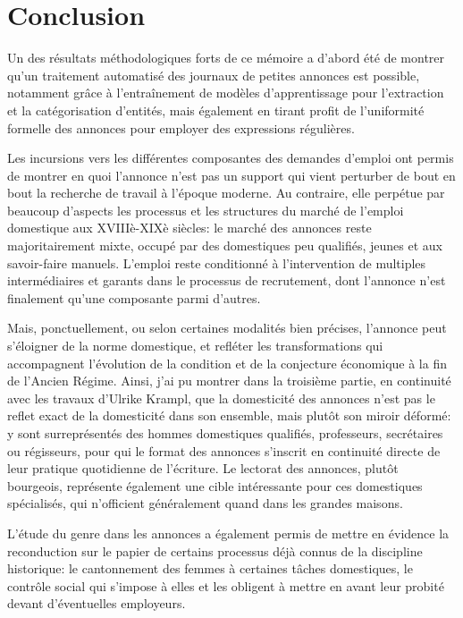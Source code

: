 \part*{Conclusion}


Un des résultats méthodologiques forts de ce mémoire a d'abord été de montrer qu'un traitement automatisé des journaux de petites annonces est possible, notamment grâce à l'entraînement de modèles d'apprentissage pour l'extraction et la catégorisation d'entités, mais également en tirant profit de l'uniformité formelle des annonces pour employer des expressions régulières. 

Les incursions vers les différentes composantes des demandes d'emploi ont permis de montrer en quoi l'annonce n'est pas un support qui vient perturber de bout en bout la recherche de travail à l'époque moderne. Au contraire, elle perpétue par beaucoup d'aspects les processus et les structures du marché de l'emploi domestique aux XVIIIè-XIXè siècles: le marché des annonces reste majoritairement mixte, occupé par des domestiques peu qualifiés, jeunes et aux savoir-faire manuels. L'emploi reste conditionné à l'intervention de multiples intermédiaires et garants dans le processus de recrutement, dont l'annonce n'est finalement qu'une composante parmi d'autres. 

Mais, ponctuellement, ou selon certaines modalités bien précises, l'annonce peut s'éloigner de la norme domestique, et refléter les transformations qui accompagnent l'évolution de la condition et de la conjecture économique à la fin de l'Ancien Régime. Ainsi, j'ai pu montrer dans la troisième partie, en continuité avec les travaux d'Ulrike Krampl, que la domesticité des annonces n'est pas le reflet exact de la domesticité dans son ensemble, mais plutôt son miroir déformé: y sont surreprésentés des hommes domestiques qualifiés, professeurs, secrétaires ou régisseurs, pour qui le format des annonces s'inscrit en continuité directe de leur pratique quotidienne de l'écriture. Le lectorat des annonces, plutôt bourgeois, représente également une cible intéressante pour ces domestiques spécialisés, qui n'officient généralement quand dans les grandes maisons. 

L'étude du genre dans les annonces a également permis de mettre en évidence la reconduction sur le papier de certains processus déjà connus de la discipline historique: le cantonnement des femmes à certaines tâches domestiques, le contrôle social qui s'impose à elles et les obligent à mettre en avant leur probité devant d'éventuelles employeurs. 

